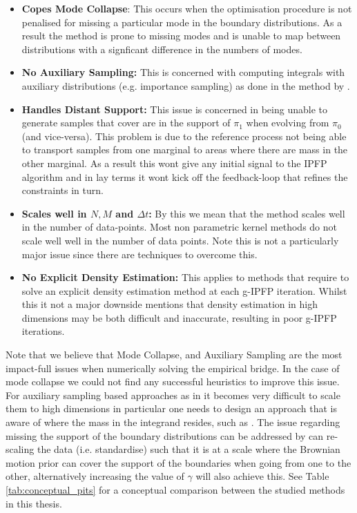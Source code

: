 \documentclass[a4paper,12pt,twoside,openright]{report}
\theoremstyle{definition}
\begin{document}
\begin{itemize}
    \item \textbf{Copes Mode Collapse}: This occurs when the optimisation procedure is not penalised for missing a particular mode in the boundary distributions. As a result the method is prone to missing modes and is unable to map between distributions with a signficant difference in the numbers of modes.
    \item \textbf{No Auxiliary Sampling:} This is concerned with computing integrals with auxiliary distributions (e.g. importance sampling) as done in the method by \cite{pavon2018data}.
    \item \textbf{Handles Distant Support:} This issue is concerned in being unable to generate samples that cover are in the support of $\pi_1$ when evolving from $\pi_0$ (and vice-versa). This problem is due to the reference process not being able to transport samples from one marginal to areas where there are mass in the other marginal. As a result this wont give any initial signal to the IPFP algorithm and in lay terms it wont kick off the feedback-loop that refines the constraints in turn.
    \item \textbf{Scales well in $N,M$ and $\Delta t$:} By this we mean that the method scales well in the number of data-points. Most non parametric kernel methods do not scale well well in the number of data points. Note this is not a particularly major issue since there are techniques to overcome this. 
    \item \textbf{No Explicit Density Estimation:} This applies to methods that require to solve an explicit density estimation method at each g-IPFP iteration. Whilst this it not a major downside  \cite{pavon2018data} mentions that density estimation in high dimensions may be both difficult and inaccurate, resulting in poor g-IPFP iterations.
\end{itemize}
Note that we believe that Mode Collapse, and Auxiliary Sampling are the most impact-full issues when numerically solving the empirical bridge. In the case of mode collapse we could not find any successful heuristics to improve this issue. For auxiliary sampling based approaches as in \cite{pavon2018data} it becomes very difficult to scale them to high dimensions in particular one needs to design an approach that is aware of where the mass in the integrand resides, such as \cite{osborne2012active}.  The issue regarding missing the support of the boundary distributions can be addressed by can re-scaling the data (i.e. standardise) such that it is at a scale where the Brownian motion prior can cover the support of the boundaries when going from one to the other, alternatively increasing the value of $\gamma$ will also achieve this. See Table \ref{tab:conceptual_pits} for a conceptual comparison between the studied methods in this thesis.
\end{document}
